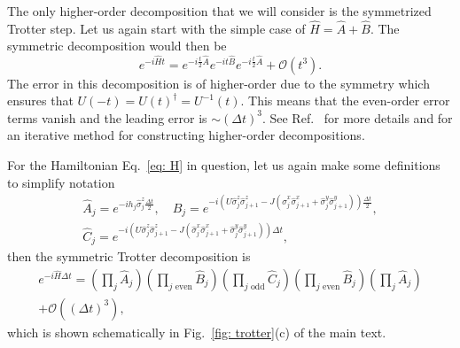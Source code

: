 \documentclass[twocolumn,showpacs,preprintnumbers,nofootinbib,amsmath,aps,pra,longbibliography,amssymb,superscriptaddress]{revtex4-1}
\begin{document}
The only higher-order decomposition that we will consider is the symmetrized Trotter step. Let us again start with the simple case of $\hat{H} = \hat{A} + \hat{B}$. The symmetric decomposition would then be
\begin{equation}
e^{-i\hat{H}t} = e^{-i\frac{t}{2} \hat{A}} e^{-i t \hat{B} } e^{-i\frac{ t}{2} \hat{A}}  + \mathcal{O}(t^3).
\end{equation}
The error in this decomposition is of higher-order due to the symmetry which ensures that $U(-t) = U(t)^\dag = U^{-1}(t)$. This means that the even-order error terms vanish and the leading error is $\sim (\Delta t)^3$. See Ref.~\cite{Hatano2005} for more details and for an iterative method for constructing higher-order decompositions.

For the Hamiltonian Eq.~\eqref{eq: H} in question, let us again make some definitions to simplify notation
\begin{equation}
\begin{gathered}
\hat{A}_j = e^{-i h_j \hat{\sigma}^z_j \frac{\Delta t}{2}}, \quad \hat{B}_j = e^{-i(U\hat{\sigma}^z_j\hat{\sigma}^z_{j+1}-J(\hat{\sigma}^x_j\hat{\sigma}^x_{j+1} +\hat{\sigma}^y_j\hat{\sigma}^y_{j+1}))\frac{\Delta t}{2}},\\ \hat{C}_j = e^{-i(U\hat{\sigma}^z_j\hat{\sigma}^z_{j+1}-J(\hat{\sigma}^x_j\hat{\sigma}^x_{j+1} +\hat{\sigma}^y_j\hat{\sigma}^y_{j+1}))\Delta t},
\end{gathered}
\end{equation}
then the symmetric Trotter decomposition is 
\begin{equation}\begin{aligned}
e^{-i\hat{H}\Delta t} =  \left( \prod_{j} \hat{A}_j \right) \left( \prod_{j \text{ even}} \hat{B}_j \right) \left( \prod_{j \text{ odd}} \hat{C}_j \right)\left( \prod_{j \text{ even}} \hat{B}_j \right) \left( \prod_{j} \hat{A}_j \right)\\ + \mathcal{O}((\Delta t)^3) ,
\end{aligned}
\end{equation}
which is shown schematically in Fig.~\ref{fig: trotter}(c) of the main text.
\end{document}
